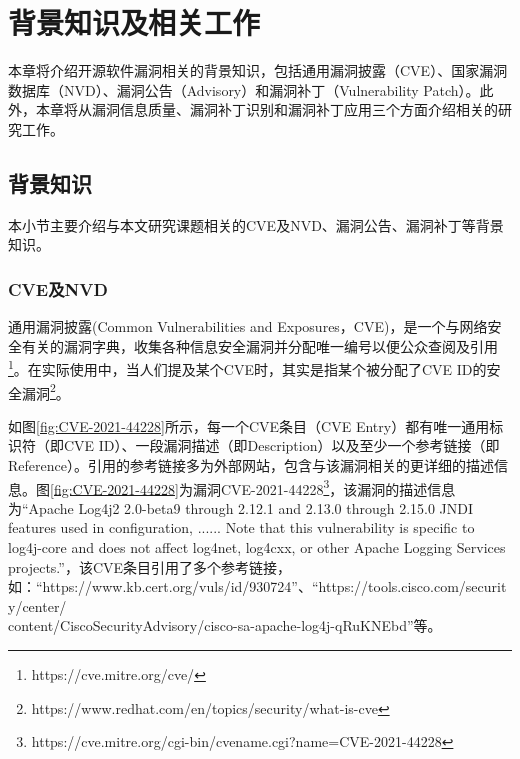 \chapter{背景知识及相关工作}
本章将介绍开源软件漏洞相关的背景知识，包括通用漏洞披露（CVE）、国家漏洞数据库（NVD）、漏洞公告（Advisory）和漏洞补丁（Vulnerability Patch）。此外，本章将从漏洞信息质量、漏洞补丁识别和漏洞补丁应用三个方面介绍相关的研究工作。


\section{背景知识}
本小节主要介绍与本文研究课题相关的CVE及NVD、漏洞公告、漏洞补丁等背景知识。

\subsection{CVE及NVD} 
通用漏洞披露(Common Vulnerabilities and Exposures，CVE)\cite{mitre2021:cve}，是一个与网络安全有关的漏洞字典，收集各种信息安全漏洞并分配唯一编号以便公众查阅及引用\footnote{https://cve.mitre.org/cve/}。在实际使用中，当人们提及某个CVE时，其实是指某个被分配了CVE ID的安全漏洞\footnote{https://www.redhat.com/en/topics/security/what-is-cve}。

如图\ref{fig:CVE-2021-44228}所示，每一个CVE条目（CVE Entry）都有唯一通用标识符（即CVE ID）、一段漏洞描述（即Description）以及至少一个参考链接（即Reference）。引用的参考链接多为外部网站，包含与该漏洞相关的更详细的描述信息。图\ref{fig:CVE-2021-44228}为漏洞CVE-2021-44228\footnote{https://cve.mitre.org/cgi-bin/cvename.cgi?name=CVE-2021-44228}，该漏洞的描述信息为“Apache Log4j2 2.0-beta9 through 2.12.1 and 2.13.0 through 2.15.0 JNDI features used in configuration, ...... Note that this vulnerability is specific to log4j-core and does not affect log4net, log4cxx, or other Apache Logging Services projects.”，该CVE条目引用了多个参考链接，如：“https://www.kb.cert.org/vuls/id/930724”、“https://tools.cisco.com/security/center/\\content/CiscoSecurityAdvisory/cisco-sa-apache-log4j-qRuKNEbd”等。

